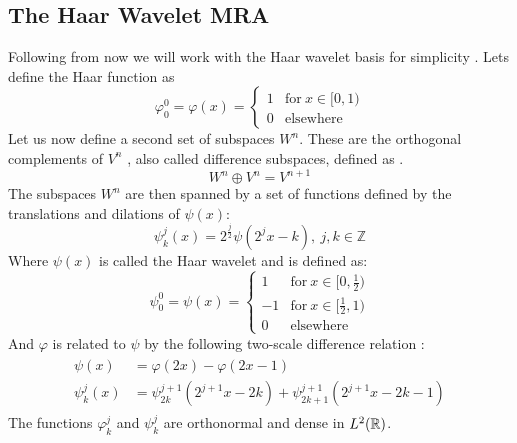 \documentclass[../master_thesis.tex]{subfiles}
\begin{document}
\subsection{The Haar Wavelet \ac{MRA}}
Following from now we will work with the Haar wavelet basis for simplicity \cite{Beylkin:MRA}.
Lets define the Haar function \cite{Schneider:2007} as
\begin{equation}
  \varphi^0_0 = \varphi(x) =
  \begin{cases}
  1 & \text{for} \ x\in [0,1)\\
  0 & \text{elsewhere}
\end{cases}
\end{equation}
Let us now define a second set of subspaces $W^n$. These are the orthogonal complements of $V^n$ \cite{Alpert1993}, also called difference subspaces,
defined as \cite{Beylkin:MRA, Sorland, Alpert1993}.
\begin{equation}
  W^n \oplus V^n = V^{n + 1} \label{eq:diffsubspace}
\end{equation}
The subspaces $W^n$ are then spanned by a set of functions defined by the translations and
dilations of $\psi(x)$:
\begin{equation}
  \psi_k^j(x) = 2^{\frac{j}{2}}\psi(2^jx - k),\  j,k \in \mathbb{Z} \label{eq:haarwavelet}
\end{equation}
Where $\psi(x)$ is called the Haar wavelet \cite{Schneider:2007} and is defined as:
\begin{equation}
  \psi^0_0 = \psi(x) =
  \begin{cases}
  1 & \text{for} \ x\in [0,\frac{1}{2})\\
  -1 & \text{for}\ x\in [\frac{1}{2}, 1)\\
  0 & \text{elsewhere}
\end{cases}
\end{equation}
And $ \varphi$ is related to $\psi$ by the following two-scale difference relation \cite{Beylkin:MRA, Schneider:2007, Sorland}:
\begin{align}
  \begin{split}\label{eq:2scalewavelet}
    \psi(x) &= \varphi(2x) - \varphi(2x - 1)\\
    \psi^j_k(x) &= \psi^{j+1}_{2k}(2^{j+1}x - 2k) + \psi^{j+1}_{2k+1}(2^{j+1}x - 2k - 1)
  \end{split}
\end{align}
The functions $\varphi^j_k$ and $\psi^j_k$ are orthonormal
and dense \cite{Beylkin:MRA, Sorland, SRJensen:2014} in $L^2(\mathbb{R})$.
\end{document}

